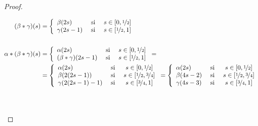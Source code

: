 \begin{teo}
\begin{proof}
\begin{enumerate}
\begin{figure}[H]
\begin{tikzpicture}
                \end{tikzpicture}
            \end{figure}
            \begin{align*}
                (\beta\ast\gamma)(s) &= \left\{
                    \begin{array}{l c c}
                        \beta(2s) & \text{ si } & s \in [0,\nicefrac{1}{2}]\\
                        \gamma(2s-1) & \text{ si } & s \in [\nicefrac{1}{2},1]\\
                    \end{array}
                \right.\\\\
                \alpha \ast(\beta\ast\gamma)(s) &= \left\{
                    \begin{array}{l c c}
                        \alpha(2s) & \text{ si } & s \in [0,\nicefrac{1}{2}]\\
                        (\beta\ast\gamma)(2s-1) & \text{ si } & s \in [\nicefrac{1}{2},1]\\
                    \end{array}
                \right. =\\
                &= \left\{
                    \begin{array}{l c c}
                        \alpha(2s) & \text{ si } & s \in [0,\nicefrac{1}{2}]\\
                        \beta(2(2s-1)) & \text{ si } & s \in [\nicefrac{1}{2},\nicefrac{3}{4}]\\
                        \gamma(2(2s-1)-1) & \text{ si } & s \in [\nicefrac{3}{4},1]\\
                    \end{array}
                \right. = \left\{
                    \begin{array}{l c c}
                        \alpha(2s) & \text{ si } & s \in [0,\nicefrac{1}{2}]\\
                        \beta(4s-2) & \text{ si } & s \in [\nicefrac{1}{2},\nicefrac{3}{4}]\\
                        \gamma(4s-3) & \text{ si } & s \in [\nicefrac{3}{4},1]\\
                    \end{array}
                \right.\\\\\\

\end{align*}
\end{enumerate}
\end{proof}
\end{teo}
